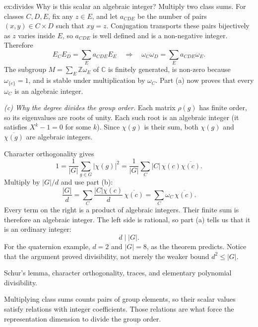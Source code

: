 \begin{solution}{ex:divides}
Why is this scalar an algebraic integer? Multiply two class sums. For classes $C,D,E$, fix any $z\in E$, and let $a_{CDE}$ be the number of pairs $(x,y)\in C\times D$ such that $xy=z$. Conjugation transports these pairs bijectively as $z$ varies inside $E$, so $a_{CDE}$ is well defined and is a non-negative integer. Therefore
\[
E_CE_D=\sum_Ea_{CDE}E_E
\quad\Longrightarrow\quad
\omega_C\omega_D=\sum_Ea_{CDE}\omega_E.
\]
The subgroup $M=\sum_E\mathbb Z\omega_E$ of $\mathbb C$ is finitely generated, is non-zero because $\omega_{\{e\}}=1$, and is stable under multiplication by $\omega_C$. Part (a) now proves that every $\omega_C$ is an algebraic integer.

\emph{(c) Why the degree divides the group order.}
Each matrix $\rho(g)$ has finite order, so its eigenvalues are roots of unity. Each such root is an algebraic integer (it satisfies $X^k-1=0$ for some $k$). Since $\chi(g)$ is their sum, both $\chi(g)$ and $\overline{\chi(g)}$ are algebraic integers.

Character orthogonality gives
\[
1=\frac1{|G|}\sum_{g\in G}|\chi(g)|^2
 =\frac1{|G|}\sum_C|C|\,\chi(c)\overline{\chi(c)}.
\]
Multiply by $|G|/d$ and use part (b):
\[
\frac{|G|}{d}
  =\sum_C\frac{|C|\chi(c)}d\,\overline{\chi(c)}
  =\sum_C\omega_C\,\overline{\chi(c)}.
\]
Every term on the right is a product of algebraic integers. Their finite sum is therefore an algebraic integer. The left side is rational, so part (a) tells us that it is an ordinary integer:
\[
\boxed{d\mid |G|}.
\]
For the quaternion example, $d=2$ and $|G|=8$, as the theorem predicts. Notice that the argument proved divisibility, not merely the weaker bound $d^2\le|G|$.

\tools Schur's lemma, character orthogonality, traces, and elementary polynomial divisibility.

\leads Multiplying class sums counts pairs of group elements, so their scalar values satisfy relations with integer coefficients. Those relations are what force the representation dimension to divide the group order.
\end{solution}

